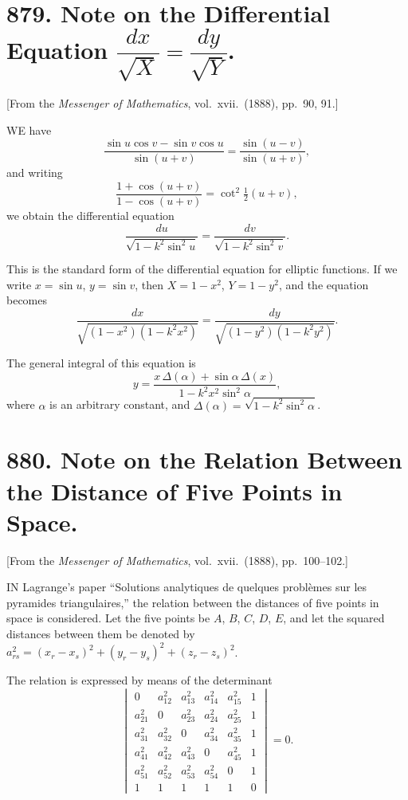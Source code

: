 \documentclass[11pt,a4paper]{book}
\begin{document}
\section[879]{879. Note on the Differential Equation $\dfrac{dx}{\sqrt{X}} = \dfrac{dy}{\sqrt{Y}}$.}
\label{sec:879}

[From the \textit{Messenger of Mathematics}, vol.\ xvii.\ (1888), pp.\ 90, 91.]

\medskip\noindent
WE have
\[
\frac{\sin u \cos v - \sin v \cos u}{\sin(u+v)} = \frac{\sin(u-v)}{\sin(u+v)},
\]
and writing
\[
\frac{1 + \cos(u+v)}{1 - \cos(u+v)} = \cot^{2}\tfrac{1}{2}(u+v),
\]
we obtain the differential equation
\[
\frac{du}{\sqrt{1 - k^{2}\sin^{2}u}} = \frac{dv}{\sqrt{1 - k^{2}\sin^{2}v}}.
\]

This is the standard form of the differential equation for elliptic functions. If we write $x = \sin u$, $y = \sin v$, then $X = 1 - x^{2}$, $Y = 1 - y^{2}$, and the equation becomes
\[
\frac{dx}{\sqrt{(1 - x^{2})(1 - k^{2}x^{2})}} = \frac{dy}{\sqrt{(1 - y^{2})(1 - k^{2}y^{2})}}.
\]

The general integral of this equation is
\[
y = \frac{x\,\Delta(\alpha) + \sin\alpha\,\Delta(x)}{1 - k^{2}x^{2}\sin^{2}\alpha},
\]
where $\alpha$ is an arbitrary constant, and $\Delta(\alpha) = \sqrt{1 - k^{2}\sin^{2}\alpha}$.

\newpage
\section[880]{880. Note on the Relation Between the Distance of Five Points in Space.}
\label{sec:880}

[From the \textit{Messenger of Mathematics}, vol.\ xvii.\ (1888), pp.\ 100--102.]

\medskip\noindent
IN Lagrange's paper ``Solutions analytiques de quelques probl\`emes sur les pyramides triangulaires,'' the relation between the distances of five points in space is considered. Let the five points be $A$, $B$, $C$, $D$, $E$, and let the squared distances between them be denoted by $a_{rs}^{2} = (x_{r} - x_{s})^{2} + (y_{r} - y_{s})^{2} + (z_{r} - z_{s})^{2}$.

The relation is expressed by means of the determinant
\[
\begin{vmatrix}
0 & a_{12}^{2} & a_{13}^{2} & a_{14}^{2} & a_{15}^{2} & 1 \\
a_{21}^{2} & 0 & a_{23}^{2} & a_{24}^{2} & a_{25}^{2} & 1 \\
a_{31}^{2} & a_{32}^{2} & 0 & a_{34}^{2} & a_{35}^{2} & 1 \\
a_{41}^{2} & a_{42}^{2} & a_{43}^{2} & 0 & a_{45}^{2} & 1 \\
a_{51}^{2} & a_{52}^{2} & a_{53}^{2} & a_{54}^{2} & 0 & 1 \\
1 & 1 & 1 & 1 & 1 & 0
\end{vmatrix} = 0.
\]
\end{document}
